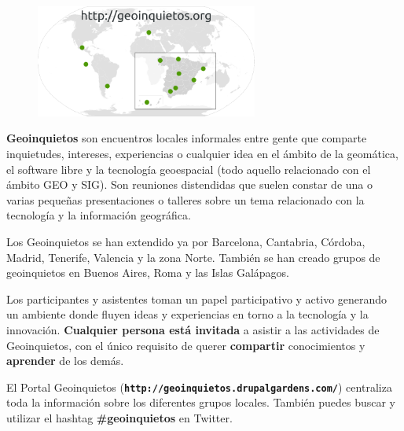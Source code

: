 \documentclass[11pt,a5]{article}
\newcommand{\alert}[1]{\textbf{\color{VerdeOscuro2!80!black}#1}}
\begin{document}
\sffamily

\begin{figure}[ht]
  \begin{center}
    \includegraphics[width=0.65\textwidth]{img/Geoinquietos-world}
  \end{center}
\end{figure}

\alert{Geoinquietos} son encuentros locales informales entre gente que comparte
inquietudes, intereses, experiencias o cualquier idea en el ámbito de la
geomática, el software libre y la tecnología geoespacial (todo aquello
relacionado con el ámbito GEO y SIG). Son reuniones distendidas que suelen
constar de una o varias pequeñas presentaciones o talleres sobre un tema
relacionado con la tecnología y la información geográfica. 

Los Geoinquietos se han extendido ya por Barcelona, Cantabria, Córdoba, Madrid,
Tenerife, Valencia y la zona Norte. También se han creado grupos de geoinquietos
en Buenos Aires, Roma y las Islas Galápagos.

Los participantes y asistentes toman un papel participativo y activo generando
un ambiente donde fluyen ideas y experiencias en torno a la tecnología y la
innovación. \alert{Cualquier persona está invitada} a asistir a las actividades
de Geoinquietos, con el único requisito de querer \alert{compartir}
conocimientos y \alert{aprender} de los demás.

El Portal Geoinquietos (\alert{\texttt{http://geoinquietos.drupalgardens.com/}})
centraliza toda la información sobre los diferentes grupos locales. También
puedes buscar y utilizar el hashtag \alert{\#geoinquietos} en Twitter. 

\end{document}
